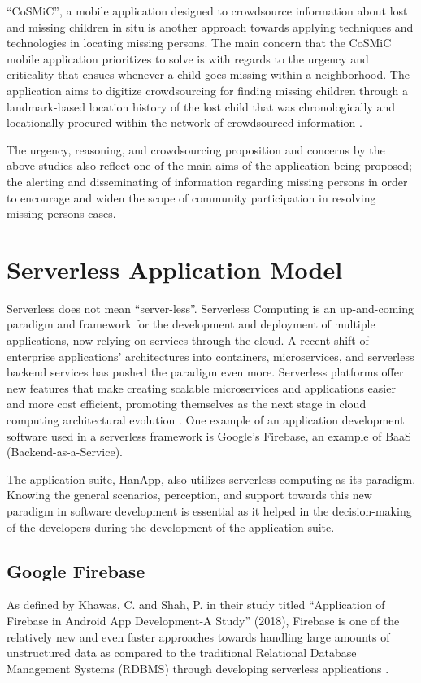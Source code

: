 “CoSMiC”, a mobile application designed to crowdsource information about lost and missing children in situ is another approach towards applying techniques and technologies in locating missing persons. The main concern that the CoSMiC mobile application prioritizes to solve is with regards to the urgency and criticality that ensues whenever a child goes missing within a neighborhood. The application aims to digitize crowdsourcing for finding missing children through a landmark-based location history of the lost child that was chronologically and locationally procured within the network of crowdsourced information \cite{shin2014cosmic}.

The urgency, reasoning, and crowdsourcing proposition and concerns by the above studies also reflect one of the main aims of the application being proposed; the alerting and disseminating of information regarding missing persons in order to encourage and widen the scope of community participation in resolving missing persons cases.

\section{Serverless Application Model}

Serverless does not mean “server-less”. Serverless Computing is an up-and-coming paradigm and framework for the development and deployment of multiple applications, now relying on services through the cloud. A recent shift of enterprise applications’ architectures into containers, microservices, and serverless backend services has pushed the paradigm even more. Serverless platforms offer new features that make creating scalable microservices and applications easier and more cost efficient, promoting themselves as the next stage in cloud computing architectural evolution \cite{castro2017serverless}. One example of an application development software used in a serverless framework is Google’s Firebase, an example of BaaS (Backend-as-a-Service).

The application suite, HanApp, also utilizes serverless computing as its paradigm. Knowing the general scenarios, perception, and support towards this new paradigm in software development is essential as it helped in the decision-making of the developers during the development of the application suite.

\subsection{Google Firebase}
As defined by Khawas, C. and Shah, P. in their study titled “Application of Firebase in Android App Development-A Study” (2018), Firebase is one of the relatively new and even faster approaches towards handling large amounts of unstructured data as compared to the traditional Relational Database Management Systems (RDBMS) through developing serverless applications 
\cite{khawas2018application}.

